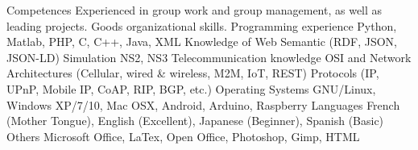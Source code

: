\begin{cvskills}
  \cvskill
    {Competences}
    {Experienced in group work and group management, as well as leading projects.}
  \cvskill
    {}
    {Goods organizational skills.}
  \cvskill
    {Programming experience}
    {Python, Matlab, PHP, C, C++, Java, XML}
  \cvskill
    {Knowledge of}
    {Web Semantic (RDF, JSON, JSON-LD)}
  \cvskill
    {Simulation}
    {NS2, NS3}
  \cvskill
    {Telecommunication knowledge}
    {OSI and Network Architectures (Cellular, wired \& wireless, M2M, IoT, REST)}
  \cvskill
  	{}
  	{Protocols (IP, UPnP, Mobile IP, CoAP, RIP, BGP, etc.)}
  \cvskill
    {Operating Systems}
    {GNU/Linux, Windows XP/7/10, Mac OSX, Android, Arduino, Raspberry}
  \cvskill
    {Languages}
    {French (Mother Tongue), English (Excellent), Japanese (Beginner), Spanish (Basic)}
  \cvskill
    {Others}
    {Microsoft Office, LaTex, Open Office, Photoshop, Gimp, HTML}
\end{cvskills}
